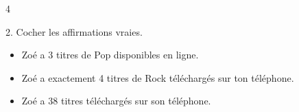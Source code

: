 \documentclass[a4paper]{book}
\begin{document}
{\begin{exerciceNote}{4}
        \medskip

        2. Cocher les affirmations vraies.

        \begin{itemize}
            \item[] \checkmark Zoé a 3 titres de Pop disponibles en ligne.
            \item[$\square$] Zoé a exactement 4 titres de Rock téléchargés sur ton téléphone.
            \item[$\square$] Zoé a 38 titres téléchargés sur son téléphone.
        \end{itemize}    
    \end{exerciceNote}


}
\end{document}

